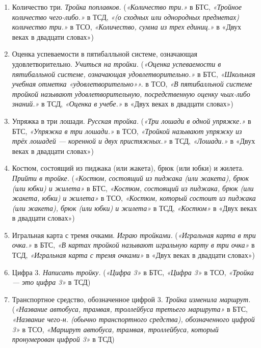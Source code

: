 \documentclass[LI,VKR]{HSEUniversity}
\begin{document}
\begin{enumerate}
    \item Количество три. \textit{Тройка поплавков.}
    (\textit{«Количество три.»} в БТС,
    \textit{«Тройное количество чего-либо.»} в ТСД,
    \textit{«(о сходных или однородных предметах) количество три.»} в ТСО,
    \textit{«Количество, сумма из трех единиц.»} в «Двух веках в двадцати словах»)

    \item Оценка успеваемости в пятибалльной системе, означающая удовлетворительно. \textit{Учиться на тройки.}
    (\textit{«Оценка успеваемости в пятибалльной системе, означающая удовлетворительно.»} в БТС,
    \textit{«Школьная учебная отметка «удовлетворительно»».} в ТСО,
    \textit{«В пятибалльной системе тройкой называют удовлетворительную, посредственную оценку чьих-либо знаний.»} в ТСД,
    \textit{«Оценка в учебе.»} в «Двух веках в двадцати словах»)

    \item Упряжка в три лошади. \textit{Русская тройка.}
    (\textit{«Три лошади в одной упряжке.»} в БТС,
    \textit{«Упряжка в три лошади.»} в ТСО,
    \textit{«Тройкой называют упряжку из трёх лошадей — коренной и двух пристяжных.»} в ТСД,
    \textit{«Лошади.»} в «Двух веках в двадцати словах»)

    \item Костюм, состоящий из пиджака (или жакета), брюк (или юбки) и жилета. \textit{Прийти в тройке.}
    (\textit{«Костюм, состоящий из пиджака (или жакета), брюк (или юбки) и жилета»} в БТС,
    \textit{«Костюм, состоящий из пиджака, брюк (или жакета, юбки) и жилета»} в ТСО,
    \textit{«Костюм, который состоит из пиджака (или жакета), брюк (или юбки) и жилета»} в ТСД,
    \textit{«Костюм»} в «Двух веках в двадцати словах»)

    \item Игральная карта с тремя очками. \textit{Играю тройками.}
    (\textit{«Игральная карта в три очка.»} в БТС,
    \textit{«В картах тройкой называют игральную карту в три очка»} в ТСД,
    \textit{«Игральная карта с тремя очками»} в «Двух веках в двадцати словах»)

    \item Цифра 3. \textit{Написать тройку.}
    (\textit{«Цифра 3»} в БТС,
    \textit{«Цифра 3»} в ТСО,
    \textit{«Тройка — это цифра 3»} в ТСД)

    \item Транспортное средство, обозначенное цифрой 3. \textit{Тройка изменила маршрут.}
    (\textit{«Название автобуса, трамвая, троллейбуса третьего маршрута»} в БТС,
    \textit{«Название чего-н. (обычно транспортного средства), обозначенного цифрой 3»} в ТСО,
    \textit{«Маршрут автобуса, трамвая, троллейбуса, который пронумерован цифрой 3»} в ТСД)


\end{enumerate}
\end{document}
